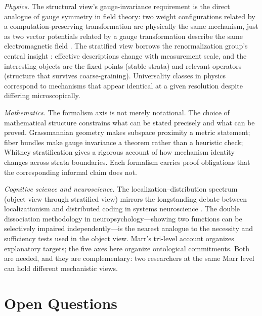 \documentclass{article}
\begin{document}
\emph{Physics.}
The structural view's gauge-invariance requirement is the direct
analogue of gauge symmetry in field theory: two weight configurations
related by a computation-preserving transformation are physically
the same mechanism, just as two vector potentials related by a gauge
transformation describe the same electromagnetic field
\citep{nakahara2003}.  The stratified view borrows the renormalization
group's central insight \citep{wilson1971,goldenfeld1992}: effective
descriptions change with measurement scale, and the interesting
objects are the fixed points (stable strata) and relevant operators
(structure that survives coarse-graining).  Universality classes
in physics correspond to mechanisms that appear identical at a given
resolution despite differing microscopically.

\emph{Mathematics.}
The formalism axis is not merely notational.  The choice of
mathematical structure constrains what can be stated precisely and
what can be proved.  Grassmannian geometry \citep{nakahara2003}
makes subspace proximity a metric statement; fiber bundles make
gauge invariance a theorem rather than a heuristic check; Whitney
stratification \citep{whitney1965,golubitsky1973} gives a rigorous
account of how mechanism identity changes across strata boundaries.
Each formalism carries proof obligations that the corresponding
informal claim does not.

\emph{Cognitive science and neuroscience.}
The localization--distribution spectrum (object view through stratified
view) mirrors the longstanding debate between localizationism and
distributed coding in systems neuroscience
\citep{bechtel1993}.  The double dissociation methodology in
neuropsychology---showing two functions can be selectively impaired
independently---is the nearest analogue to the necessity and
sufficiency tests used in the object view.  Marr's tri-level account
\citep{marr1982} organizes explanatory targets; the five axes here
organize ontological commitments.  Both are needed, and they are
complementary: two researchers at the same Marr level can hold different
mechanistic views.

\section{Open Questions}\label{sec:open}
\end{document}

